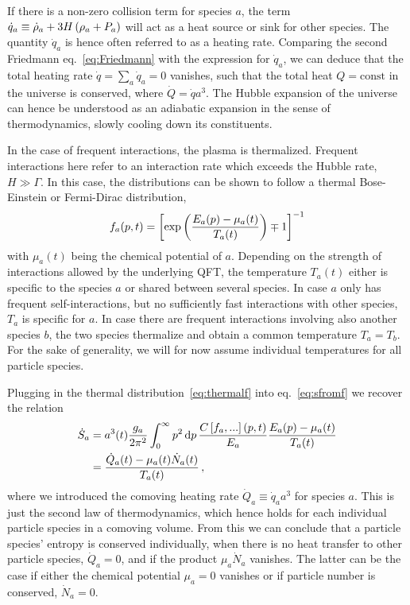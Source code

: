 If there is a non-zero collision term for species $a$, the term $\dot{q}_a \equiv \dot{\rho}_a + 3 H \left( \rho_a + P_a \right)$ will act as a heat source or sink for other species. The quantity $\dot{q}_a$ is hence often referred to as a heating rate. Comparing the second Friedmann eq.~\eqref{eq:Friedmann} with the  expression for $\dot{q}_a$, we can deduce that the total heating rate $\dot{q} = \sum_a \dot{q}_a = 0$ vanishes, such that the total heat $Q = \text{const}$ in the universe is conserved, where $\dot{Q} = \dot{q} a^3$. The Hubble expansion of the universe can hence be understood as an adiabatic expansion in the sense of thermodynamics, slowly cooling down its constituents.

In the case of frequent interactions, the plasma is thermalized.  Frequent interactions here refer to an interaction rate which exceeds the Hubble rate, $H\gg \Gamma$. In this case, the distributions can be shown to follow a thermal Bose-Einstein or Fermi-Dirac distribution, 
\begin{align}
	f_a(p, t) = \left[ \exp \left( \frac{E_a(p) - \mu_a(t)}{T_a(t)}  \right) \mp 1 \right]^{-1} \label{eq:thermalf}
\end{align}
with $\mu_a(t)$ being the chemical potential of $a$. Depending on the strength of interactions allowed by the underlying \ac{QFT}, the temperature $T_a(t)$ either is specific to the species $a$ or shared between several species. In case $a$ only has frequent self-interactions, but no sufficiently fast interactions with other species, $T_a$ is specific for $a$. In case there are frequent interactions involving also another species $b$, the two species thermalize and obtain a common temperature $T_a = T_b$. For the sake of generality, we will for now assume individual temperatures for all particle species.

Plugging in the thermal distribution~\eqref{eq:thermalf} into eq.~\eqref{eq:sfromf} we recover the relation
\begin{align}
	\dot{S}_a &= a^3(t) \frac{g_a}{2 \pi^2} \int_0^\infty p^2 \mathop{}\!\mathrm{d} p \, \frac{C\left[ f_a, ... \right](p,t)}{E_a}  \frac{E_a(p)- \mu_a(t)}{T_a(t)}  \\
	&= \frac{\dot{Q}_a(t) - \mu_a(t) \dot{N}_a(t)}{T_a(t)}\,, \label{eq:2ndlawIntegrated}
\end{align}
where we introduced the comoving heating rate $\dot{Q}_a \equiv \dot{q}_a a^3$ for species $a$. This is just the second law of thermodynamics, which hence holds for each individual particle species in a comoving volume. From this we can conclude that  a particle species' entropy is conserved individually, when there is no  heat transfer to other particle species, $\dot{Q}_a = 0$, and if the product $\mu_a \dot{N}_a$ vanishes. The latter can be the case if either the chemical potential $\mu_a= 0$ vanishes or if particle number is conserved, $\dot{N}_a = 0$.

